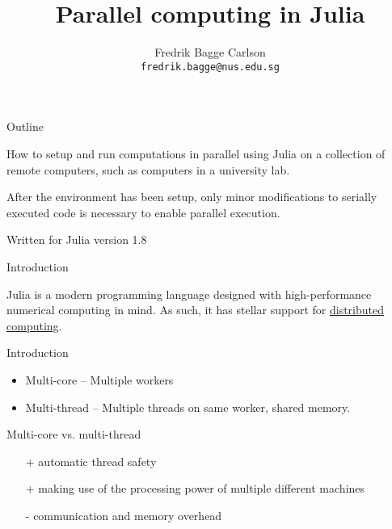 \documentclass[10pt]{beamer}
\begin{document}
\newlength\figureheight
\newlength\figurewidth
\setlength{\figurewidth}{0.4\textwidth}
\setlength{\figureheight }{4cm }

\title{Parallel computing in Julia}
\author{Fredrik Bagge Carlson\\ \texttt{fredrik.bagge@nus.edu.sg}}

\maketitle
\begin{frame}{Outline}{}

	How to setup and run computations in parallel using Julia on a collection of remote computers, such as computers in a university lab.

	After the environment has been setup, only minor modifications to serially executed code is necessary to enable parallel execution.

	Written for Julia version 1.8

\end{frame}

\begin{frame}{Introduction}

	Julia is a modern programming language designed with high-performance numerical computing in mind. As such, it has stellar support for \href{https://docs.julialang.org/en/v1/manual/parallel-computing/}{distributed computing}.
\end{frame}


\begin{frame}{Introduction}{}
	\begin{itemize}
		\item Multi-core -- Multiple workers
		\item Multi-thread -- Multiple threads on same worker, shared memory.
	\end{itemize}

	Multi-core vs. multi-thread
	\begin{itemize}
		\item[+] automatic thread safety
		\item[+] making use of the processing power of multiple different machines
		\item[-] communication and memory overhead
	\end{itemize}
\end{frame}
\end{document}
